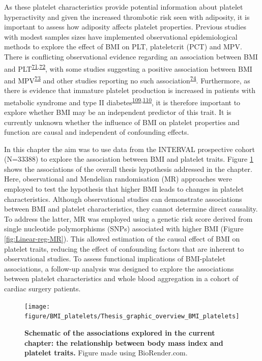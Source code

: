 \documentclass[11pt,twoside]{bristolthesis}
\begin{document}
As these platelet characteristics provide potential information about platelet hyperactivity and given the increased thrombotic risk seen with adiposity, it is important to assess how adiposity affects platelet properties. Previous studies with modest samples sizes have implemented observational epidemiological methods to explore the effect of BMI on PLT, plateletcrit (PCT) and MPV. There is conflicting observational evidence regarding an association between BMI and PLT\textsuperscript{\protect\hyperlink{ref-Furuncuoglu2016}{71},\protect\hyperlink{ref-Han2018a}{72}}, with some studies suggesting a positive association between BMI and MPV\textsuperscript{\protect\hyperlink{ref-Coban2005}{73}} and other studies reporting no such association\textsuperscript{\protect\hyperlink{ref-Heffron2018}{74}}. Furthermore, as there is evidence that immature platelet production is increased in patients with metabolic syndrome and type II diabetes\textsuperscript{\protect\hyperlink{ref-Vaduganathan2008a}{109},\protect\hyperlink{ref-Mijovic2015a}{110}}, it is therefore important to explore whether BMI may be an independent predictor of this trait. It is currently unknown whether the influence of BMI on platelet properties and function are causal and independent of confounding effects.

In this chapter the aim was to use data from the INTERVAL prospective cohort (N=33388) to explore the association between BMI and platelet traits. Figure \ref{fig:BMI-platelet-overview} shows the associations of the overall thesis hypothesis addressed in the chapter. Here, observational and Mendelian randomisation (MR) approaches were employed to test the hypothesis that higher BMI leads to changes in platelet characteristics. Although observational studies can demonstrate associations between BMI and platelet characteristics, they cannot determine direct causality. To address the latter, MR was employed using a genetic risk score derived from single nucleotide polymorphisms (SNPs) associated with higher BMI (Figure \ref{fig:Linear-reg-MR}). This allowed estimation of the causal effect of BMI on platelet traits, reducing the effect of confounding factors that are inherent to observational studies. To assess functional implications of BMI-platelet associations, a follow-up analysis was designed to explore the associations between platelet characteristics and whole blood aggregation in a cohort of cardiac surgery patients.



\begin{figure}

{\centering \texttt{[image: figure/BMI\_platelets/Thesis\_graphic\_overview\_BMI\_platelets]} 

}

\caption[Schematic of the associations explored in the current chapter: the relationship between body mass index and platelet traits.]{\textbf{Schematic of the associations explored in the current chapter: the relationship between body mass index and platelet traits.} Figure made using BioRender.com.}\label{fig:BMI-platelet-overview}
\end{figure}
\end{document}
